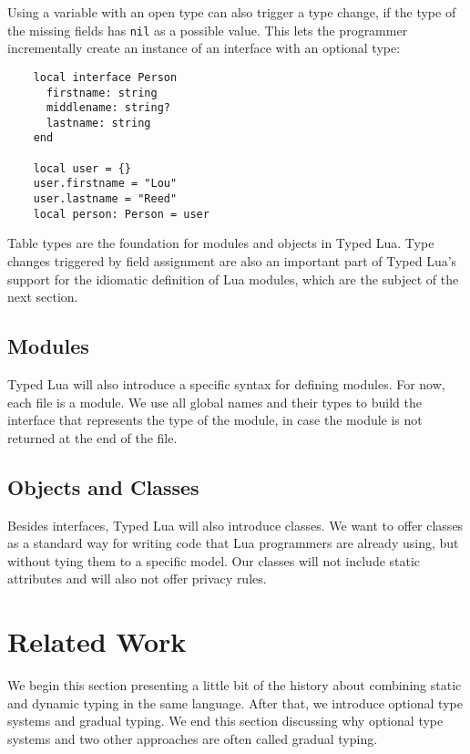 \documentclass[preprint]{sig-alternate}
\begin{document}
Using a variable with an open type can also trigger a
type change, if the type of the missing fields has
{\tt nil} as a possible value. This lets the programmer
incrementally create an instance of an interface with
an optional type:

\begin{verbatim}
    local interface Person
      firstname: string
      middlename: string?
      lastname: string
    end

    local user = {}
    user.firstname = "Lou"
    user.lastname = "Reed"
    local person: Person = user
\end{verbatim}

Table types are the foundation for modules and objects in
Typed Lua. Type changes triggered by field assignment are
also an important part of Typed Lua's support for the
idiomatic definition of Lua modules, which are the
subject of the next section.

\subsection{Modules}

Typed Lua will also introduce a specific syntax for defining modules.
For now, each file is a module.
We use all global names and their types to build the interface that
represents the type of the module, in case the module is not returned
at the end of the file.

\subsection{Objects and Classes}

Besides interfaces, Typed Lua will also introduce classes.
We want to offer classes as a standard way for writing code that
Lua programmers are already using, but without tying them to a
specific model.
Our classes will not include static attributes and will also not offer
privacy rules.


\section{Related Work}
 \label{sec:review}

We begin this section presenting a little bit of the history about
combining static and dynamic typing in the same language.
After that, we introduce optional type systems and gradual typing.
We end this section discussing why optional type systems and two
other approaches are often called gradual typing.
\end{document}
